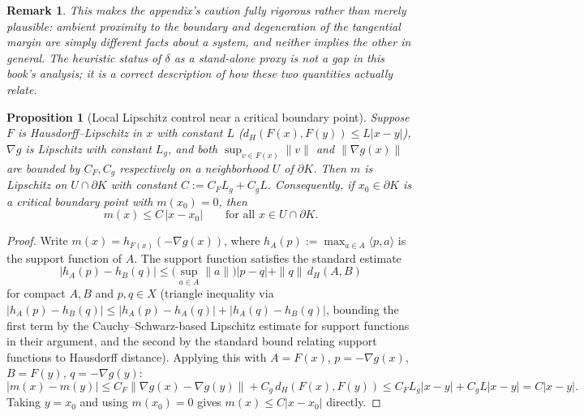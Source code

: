 \documentclass[11pt]{report}
\newtheorem{proposition}{Proposition}[chapter]
\newtheorem{remark}{Remark}[chapter]
\begin{document}
\begin{remark}
This makes the appendix's caution fully rigorous rather than merely
plausible: ambient proximity to the boundary and degeneration of the
tangential margin are simply different facts about a system, and
neither implies the other in general. The heuristic status of $\delta$
as a stand-alone proxy is not a gap in this book's analysis; it is a
correct description of how these two quantities actually relate.
\end{remark}

\begin{proposition}[Local Lipschitz control near a critical boundary point]
Suppose $F$ is Hausdorff--Lipschitz in $x$ with constant $L$
($d_H(F(x),F(y)) \leq L|x-y|$), $\nabla g$ is Lipschitz with constant
$L_g$, and both $\sup_{v \in F(x)} \|v\|$ and $\|\nabla g(x)\|$ are
bounded by $C_F, C_g$ respectively on a neighborhood $U$ of
$\partial K$. Then $m$ is Lipschitz on $U \cap \partial K$ with constant
$C := C_F L_g + C_g L$. Consequently, if $x_0 \in \partial K$ is a
critical boundary point with $m(x_0) = 0$, then
\[
m(x) \leq C\,|x - x_0| \qquad \text{for all } x \in U \cap \partial K.
\]
\end{proposition}
\begin{proof}
Write $m(x) = h_{F(x)}(-\nabla g(x))$, where
$h_A(p) := \max_{a \in A} \langle p, a \rangle$ is the support function
of $A$. The support function satisfies the standard estimate
\[
|h_A(p) - h_B(q)| \leq \Big(\sup_{a \in A}\|a\|\Big)|p-q| + \|q\|\, d_H(A,B)
\]
for compact $A,B$ and $p,q \in X$ (triangle inequality via
$|h_A(p)-h_B(q)| \leq |h_A(p)-h_A(q)| + |h_A(q)-h_B(q)|$, bounding the
first term by the Cauchy--Schwarz-based Lipschitz estimate for support
functions in their argument, and the second by the standard bound
relating support functions to Hausdorff distance). Applying this with
$A = F(x)$, $p = -\nabla g(x)$, $B = F(y)$, $q = -\nabla g(y)$:
\[
|m(x) - m(y)| \leq C_F \|\nabla g(x) - \nabla g(y)\| + C_g\, d_H(F(x),F(y))
\leq C_F L_g |x-y| + C_g L |x-y| = C|x-y|.
\]
Taking $y = x_0$ and using $m(x_0) = 0$ gives $m(x) \leq C|x-x_0|$
directly.
\end{proof}
\end{document}
